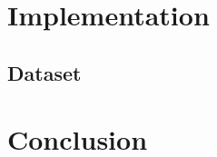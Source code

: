 \documentclass[\myFontSize,oneside,english,hidelinks,a4paper]{article}
\begin{document}
\clearpage{}
\section{Implementation}
\subsection{Dataset}


\clearpage{}
\section{Conclusion}


\clearpage
\thispagestyle{empty}
\mbox{}
\clearpage






\clearpage 
\normalsize 
 
 
\nocite{*}
\end{document}
